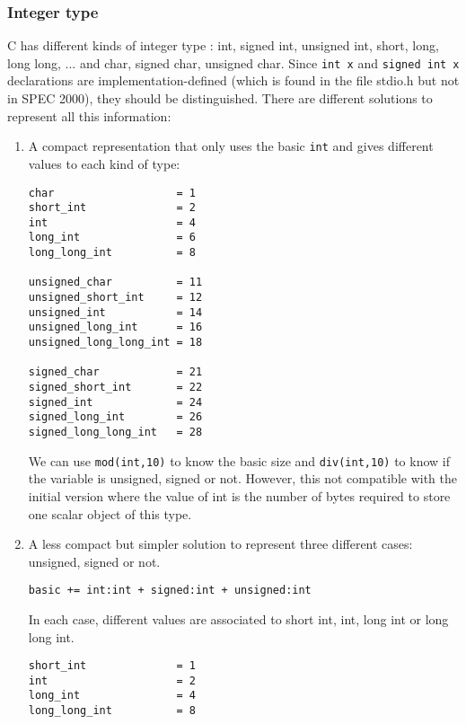 \documentclass[a4paper]{article}
\begin{document}
\subsubsection{Integer type}
\label{int}
C has different kinds of integer type : int, signed int, unsigned int,
short, long, long long, ... and char, signed char, unsigned char. Since 
\verb/int x/ and  \verb/signed int x/ declarations are
implementation-defined (which is found in the file
stdio.h but not in SPEC 2000), they should be distinguished. 
There are different solutions to represent all this information:
\begin{enumerate}
\item A compact representation that only uses the basic \verb/int/ and gives different values to
each kind of type:
\begin{verbatim}
char                   = 1
short_int              = 2
int                    = 4
long_int               = 6
long_long_int          = 8

unsigned_char          = 11
unsigned_short_int     = 12
unsigned_int           = 14
unsigned_long_int      = 16
unsigned_long_long_int = 18

signed_char            = 21
signed_short_int       = 22
signed_int             = 24
signed_long_int        = 26
signed_long_long_int   = 28
\end{verbatim}
We can use \verb/mod(int,10)/ to know the basic size  and
\verb/div(int,10)/ to know if the variable is unsigned, signed
or not. However, this  not compatible with the initial version
\cite{Coel01} where the value
of int is the number of bytes required to store one scalar object of this
type. 
\item A less compact but simpler solution to represent three different
  cases: unsigned, signed or not. 

\verb/basic += int:int + signed:int + unsigned:int/

In each case, different values are associated to short int,
int, long int or long long int. 
\begin{verbatim}
short_int              = 1
int                    = 2
long_int               = 4
long_long_int          = 8
\end{verbatim}
\end{enumerate}
\end{document}
